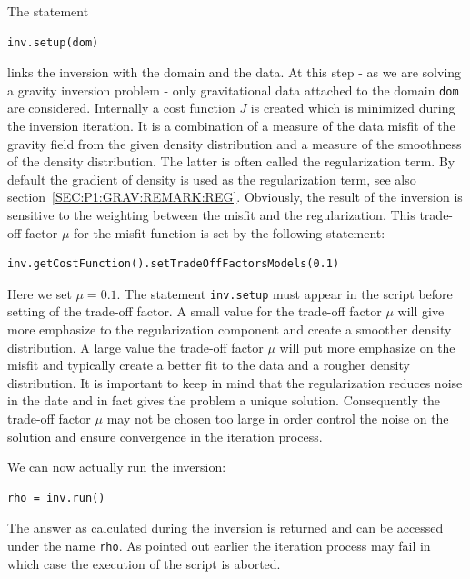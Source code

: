 The statement 
\begin{verbatim}
inv.setup(dom)
\end{verbatim}
links the inversion with the domain and the data. At this step - as we are solving a gravity inversion problem -
only gravitational data attached to the domain \verb|dom| are considered. Internally a cost function $J$
is created which is minimized during the inversion iteration. It is a combination of
a measure of the data misfit of the gravity field from the given density distribution and 
a measure of the smoothness of the density distribution. The latter is often called the regularization term. By default 
the gradient of density is used as the regularization term, see also section~\ref{SEC:P1:GRAV:REMARK:REG}. 
Obviously, the result of the inversion is sensitive to the weighting between the misfit and the regularization. This
trade-off factor $\mu$ for the misfit function is set by the following statement:
\begin{verbatim}
inv.getCostFunction().setTradeOffFactorsModels(0.1) 
\end{verbatim}
Here we set $\mu=0.1$. The statement \verb|inv.setup| must appear in the script before setting of the trade-off factor.
A small value for the trade-off factor $\mu$ will give more emphasize to the regularization component 
and create a smoother density distribution. A large value the trade-off factor $\mu$ will put more emphasize on the
misfit and typically create a better fit to the data and a rougher density distribution. It is important to keep in mind that
the regularization reduces noise in the date and in fact gives the problem a unique solution. Consequently 
the trade-off factor $\mu$ may not be chosen too large in order control the noise on the solution and ensure convergence in
the iteration process.

We can now actually run the inversion:
\begin{verbatim}
rho = inv.run()
\end{verbatim}
The answer as calculated during the inversion is returned and can be accessed under the name \verb|rho|. As pointed out earlier
the iteration process may fail in which case the execution of the script is aborted. 


